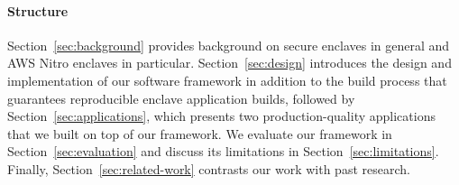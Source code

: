 \paragraph{Structure}

Section~\ref{sec:background} provides background on secure enclaves in general
and AWS Nitro enclaves in particular.  Section~\ref{sec:design} introduces the
design and implementation of our software framework in addition to the build
process that guarantees reproducible enclave application builds, followed by
Section~\ref{sec:applications}, which presents two production-quality
applications that we built on top of our framework.  We evaluate our framework
in Section~\ref{sec:evaluation} and discuss its limitations in
Section~\ref{sec:limitations}.  Finally, Section~\ref{sec:related-work}
contrasts our work with past research.
